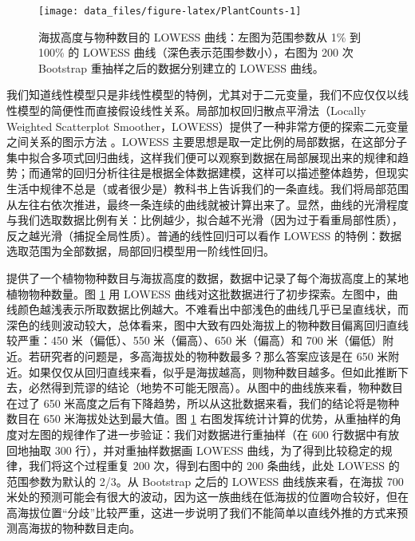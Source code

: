 \documentclass[
  b5paper,
  UTF8,twoside]{book}
\begin{document}
\begin{figure}

{\centering \texttt{[image: data\_files/figure-latex/PlantCounts-1]} 

}

\caption[海拔高度与物种数目的 LOWESS 曲线]{海拔高度与物种数目的 LOWESS 曲线：左图为范围参数从 1\% 到 100\% 的 LOWESS 曲线（深色表示范围参数小），右图为 200 次 Bootstrap 重抽样之后的数据分别建立的 LOWESS 曲线。}\label{fig:PlantCounts}
\end{figure}



我们知道线性模型只是非线性模型的特例，尤其对于二元变量，我们不应仅仅以线性模型的简便性而直接假设线性关系。局部加权回归散点平滑法（Locally Weighted Scatterplot Smoother，LOWESS）提供了一种非常方便的探索二元变量之间关系的图示方法 \citep{Cleveland79}。LOWESS 主要思想是取一定比例的局部数据，在这部分子集中拟合多项式回归曲线，这样我们便可以观察到数据在局部展现出来的规律和趋势；而通常的回归分析往往是根据全体数据建模，这样可以描述整体趋势，但现实生活中规律不总是（或者很少是）教科书上告诉我们的一条直线。我们将局部范围从左往右依次推进，最终一条连续的曲线就被计算出来了。显然，曲线的光滑程度与我们选取数据比例有关：比例越少，拟合越不光滑（因为过于看重局部性质），反之越光滑（捕捉全局性质）。普通的线性回归可以看作 LOWESS 的特例：数据选取范围为全部数据，局部回归模型用一阶线性回归。

\citet{Xie08LOWESS} 提供了一个植物物种数目与海拔高度的数据，数据中记录了每个海拔高度上的某地植物物种数量。图 \ref{fig:PlantCounts} 用 LOWESS 曲线对这批数据进行了初步探索。左图中，曲线颜色越浅表示所取数据比例越大。不难看出中部浅色的曲线几乎已呈直线状，而深色的线则波动较大，总体看来，图中大致有四处海拔上的物种数目偏离回归直线较严重：450 米（偏低）、550 米（偏高）、650 米（偏高）和 700 米（偏低）附近。若研究者的问题是，多高海拔处的物种数最多？那么答案应该是在 650 米附近。如果仅仅从回归直线来看，似乎是海拔越高，则物种数目越多。但如此推断下去，必然得到荒谬的结论（地势不可能无限高）。从图中的曲线族来看，物种数目在过了 650 米高度之后有下降趋势，所以从这批数据来看，我们的结论将是物种数目在 650 米海拔处达到最大值。图 \ref{fig:PlantCounts} 右图发挥统计计算的优势，从重抽样的角度对左图的规律作了进一步验证：我们对数据进行重抽样（在 600 行数据中有放回地抽取 300 行），并对重抽样数据画 LOWESS 曲线，为了得到比较稳定的规律，我们将这个过程重复 200 次，得到右图中的 200 条曲线，此处 LOWESS 的范围参数为默认的 2/3。从 Bootstrap 之后的 LOWESS 曲线族来看，在海拔 700 米处的预测可能会有很大的波动，因为这一族曲线在低海拔的位置吻合较好，但在高海拔位置``分歧''比较严重，这进一步说明了我们不能简单以直线外推的方式来预测高海拔的物种数目走向。
\end{document}
